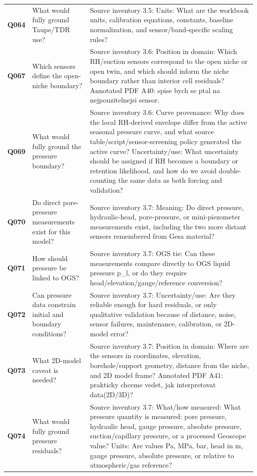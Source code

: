 \begin{longtable}{@{}L{0.10\textwidth} L{0.30\textwidth} L{0.52\textwidth}@{}}
\addlinespace[0.22em]
\textbf{Q064} & What would fully ground Taupe/TDR use? & Source inventory 3.5: Units: What are the workbook units, calibration equations, constants, baseline normalization, and sensor/band-specific scaling rules?\\
\addlinespace[0.22em]
\textbf{Q067} & Which sensors define the open-niche boundary? & Source inventory 3.6: Position in domain: Which RH/suction sensors correspond to the open niche or open twin, and which should inform the niche boundary rather than interior cell residuals? Annotated PDF A40: spise bych se ptal na nejpouzitelnejsi sensor.\\
\addlinespace[0.22em]
\textbf{Q069} & What would fully ground the pressure boundary? & Source inventory 3.6: Curve provenance: Why does the local RH-derived envelope differ from the active seasonal pressure curve, and what source table/script/sensor-screening policy generated the active curve? Uncertainty/use: What uncertainty should be assigned if RH becomes a boundary or retention likelihood, and how do we avoid double-counting the same data as both forcing and validation?\\
\addlinespace[0.22em]
\textbf{Q070} & Do direct pore-pressure measurements exist for this model? & Source inventory 3.7: Meaning: Do direct pressure, hydraulic-head, pore-pressure, or mini-piezometer measurements exist, including the two more distant sensors remembered from Gesa material?\\
\addlinespace[0.22em]
\textbf{Q071} & How should pressure be linked to OGS? & Source inventory 3.7: OGS tie: Can these measurements compare directly to OGS liquid pressure p\_l, or do they require head/elevation/gauge/reference conversion?\\
\addlinespace[0.22em]
\textbf{Q072} & Can pressure data constrain initial and boundary conditions? & Source inventory 3.7: Uncertainty/use: Are they reliable enough for hard residuals, or only qualitative validation because of distance, noise, sensor failures, maintenance, calibration, or 2D-model error?\\
\addlinespace[0.22em]
\textbf{Q073} & What 2D-model caveat is needed? & Source inventory 3.7: Position in domain: Where are the sensors in coordinates, elevation, borehole/support geometry, distance from the niche, and 2D model frame? Annotated PDF A41: prakticky chceme vedet, jak interpretovat data(2D/3D)?\\
\addlinespace[0.22em]
\textbf{Q074} & What would fully ground pressure residuals? & Source inventory 3.7: What/how measured: What pressure quantity is measured: pore pressure, hydraulic head, gauge pressure, absolute pressure, suction/capillary pressure, or a processed Geoscope value? Units: Are values Pa, MPa, bar, head in m, gauge pressure, absolute pressure, or relative to atmospheric/gas reference?\\

\end{longtable}

